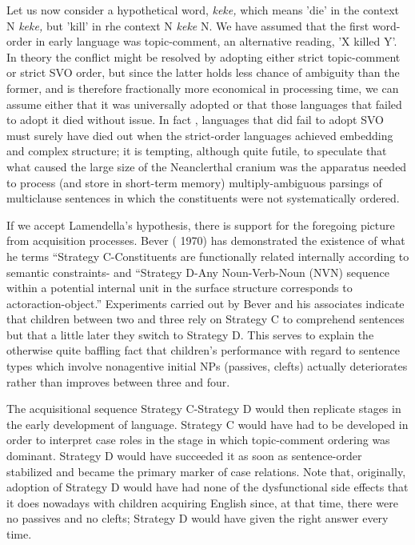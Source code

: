 Let us now consider a hypothetical word, \textit{keke,} which means
'die' in the context N \textit{keke,} but 'kill' in rhe context N \textit{keke} N. We have assumed that the first word-order in early language was topic-comment,
an alternative reading, 'X killed Y'. In theory the conflict might be
resolved by adopting either strict topic-comment or strict SVO order, but since the latter holds less chance of ambiguity than the former, and is therefore fractionally more economical in processing time, we can assume either that it was universally adopted or that those languages that failed to adopt it died without issue. In fact , languages that did
fail to adopt SVO must surely have died out when the strict-order
languages achieved embedding and complex structure; it is tempting, although quite futile, to speculate that what caused the large size of the Neanclerthal cranium was the apparatus needed to process (and store in short-term memory) multiply-ambiguous parsings of multiclause sentences in which the constituents were not systematically ordered.

If we accept Lamendella's hypothesis, there is support for the foregoing picture from acquisition processes. Bever ( 1970) has demon\-strated the existence of what he terms ``Strategy C{\textquotedbl}{}-{\textquotedbl}Constituents are functionally related internally according to semantic constraints{\textquotedbl}- and ``Strategy D{\textquotedbl}{}-{\textquotedbl}Any Noun-Verb-Noun (NVN) sequence within a potential internal unit in the surface structure corresponds to actor\-action-object.'' Experiments carried out by Bever and his associates indicate that children between two and three rely on Strategy C to comprehend sentences but that a little later they switch to Strategy D. This serves to explain the otherwise quite baffling fact that children's performance with regard to sentence types which involve nonagentive initial NPs (passives, clefts) actually deteriorates rather than improves between three and four.

The acquisitional sequence Strategy C-Strategy D would then replicate stages in the early development of language. Strategy C would have had to be developed in order to interpret case roles in the stage
in which topic-comment ordering was dominant. Strategy D would have succeeded it as soon as sentence-order stabilized and became the pri\-mary marker of case relations. Note that, originally, adoption of Stra\-tegy D would have had none of the dysfunctional side effects that it does nowadays with children acquiring English since, at that time, there were no passives and no clefts; Strategy D would have given the right answer every time.

